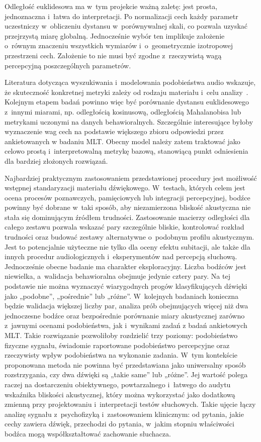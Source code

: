\documentclass{article}
\begin{document}
Odległość euklidesowa ma w~tym projekcie ważną zaletę: jest prosta, jednoznaczna i~łatwa do interpretacji. Po normalizacji cech każdy parametr uczestniczy w~obliczeniu dystansu w~porównywalnej skali, co pozwala uzyskać przejrzystą miarę globalną. Jednocześnie wybór ten implikuje założenie o~równym znaczeniu wszystkich wymiarów i~o~geometrycznie izotropowej przestrzeni cech. Założenie to nie musi być zgodne z~rzeczywistą wagą percepcyjną poszczególnych parametrów.

Literatura dotycząca wyszukiwania i~modelowania podobieństwa audio wskazuje, że skuteczność konkretnej metryki zależy od rodzaju materiału i~celu analizy~\cite{HelenVirtanen2010AudioQuery,Siedenburg2017TimbreSimilarity}. Kolejnym etapem badań powinno więc być porównanie dystansu euklidesowego z~innymi miarami, np. odległością kosinusową, odległością Mahalanobisa lub metrykami uczonymi na danych behawioralnych. Szczególnie interesujące byłoby wyznaczenie wag cech na podstawie większego zbioru odpowiedzi przez ankietowanych w badaniu MLT.
Obecny model należy zatem traktować jako celowo prostą i~interpretowalną metrykę bazową, stanowiącą punkt odniesienia dla bardziej złożonych rozwiązań.

Najbardziej praktycznym zastosowaniem przedstawionej procedury jest możliwość wstępnej standaryzacji materiału dźwiękowego. W~testach, których celem jest ocena procesów poznawczych, pamięciowych lub integracji percepcyjnej, bodźce powinny być dobrane w~taki sposób, aby niezamierzona bliskość akustyczna nie stała się dominującym źródłem trudności. Zastosowanie macierzy odległości dla całego zestawu pozwala wskazać pary szczególnie bliskie, kontrolować rozkład trudności oraz budować zestawy alternatywne o~podobnym profilu akustycznym. Jest to potencjalnie użyteczne nie tylko dla oceny efektu subitacji, ale także dla innych procedur audiologicznych i~eksperymentów nad percepcją słuchową. Jednocześnie obecne badanie ma charakter eksploracyjny. Liczba bodźców jest niewielka, a~walidacja behawioralna obejmuje jedynie cztery pary. Na tej podstawie nie można wyznaczyć wiarygodnych progów klasyfikujących dźwięki jako „podobne”, „pośrednie” lub „różne”. W~kolejnych badaniach konieczna będzie walidacja większej liczby par, analiza prób obejmujących więcej niż dwa jednoczesne bodźce oraz bezpośrednie porównanie miary akustycznej zarówno z~jawnymi ocenami podobieństwa, jak i~wynikami zadań z badań ankietowych MLT. Takie rozwiązanie pozwoliłoby rozdzielić trzy poziomy: podobieństwo fizyczne sygnału, świadomie raportowane podobieństwo percepcyjne oraz rzeczywisty wpływ podobieństwa na wykonanie zadania. W~tym kontekście proponowana metoda nie powinna być przedstawiana jako uniwersalny sposób rozstrzygania, czy dwa dźwięki są „takie same” lub „różne”. Jej wartość polega raczej na dostarczeniu obiektywnego, powtarzalnego i~łatwego do audytu wskaźnika bliskości akustycznej, który można wykorzystać jako dodatkową zmienną przy projektowaniu i~interpretacji testów słuchowych. Takie ujęcie łączy analizę sygnału z~psychofizyką i~zastosowaniem klinicznym: od pytania, jakie cechy zawiera dźwięk, przechodzi do pytania, w~jakim stopniu właściwości bodźca mogą współkształtować zachowanie słuchacza.
\end{document}
